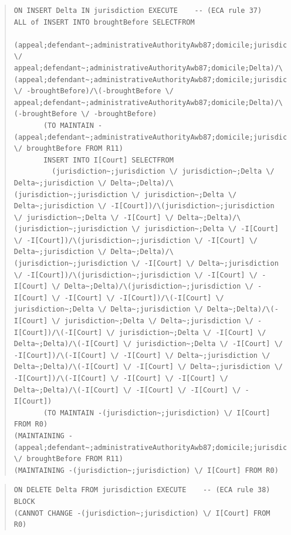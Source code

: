 \documentclass[10pt,a4paper]{report}              %
\theoremstyle{plain}\theorembodyfont{\rmfamily}\newtheorem{definition}{Definition}[section]
\theoremstyle{plain}\theorembodyfont{\rmfamily}\newtheorem{designrule}[definition]{Requirement}
\begin{document}
\begin{quote}
\begin{verbatim}
ON INSERT Delta IN jurisdiction EXECUTE    -- (ECA rule 37)
ALL of INSERT INTO broughtBefore SELECTFROM
         (appeal;defendant~;administrativeAuthorityAwb87;domicile;jurisdiction \/ appeal;defendant~;administrativeAuthorityAwb87;domicile;Delta)/\(appeal;defendant~;administrativeAuthorityAwb87;domicile;jurisdiction \/ -broughtBefore)/\(-broughtBefore \/ appeal;defendant~;administrativeAuthorityAwb87;domicile;Delta)/\(-broughtBefore \/ -broughtBefore)
       (TO MAINTAIN -(appeal;defendant~;administrativeAuthorityAwb87;domicile;jurisdiction) \/ broughtBefore FROM R11)
       INSERT INTO I[Court] SELECTFROM
         (jurisdiction~;jurisdiction \/ jurisdiction~;Delta \/ Delta~;jurisdiction \/ Delta~;Delta)/\(jurisdiction~;jurisdiction \/ jurisdiction~;Delta \/ Delta~;jurisdiction \/ -I[Court])/\(jurisdiction~;jurisdiction \/ jurisdiction~;Delta \/ -I[Court] \/ Delta~;Delta)/\(jurisdiction~;jurisdiction \/ jurisdiction~;Delta \/ -I[Court] \/ -I[Court])/\(jurisdiction~;jurisdiction \/ -I[Court] \/ Delta~;jurisdiction \/ Delta~;Delta)/\(jurisdiction~;jurisdiction \/ -I[Court] \/ Delta~;jurisdiction \/ -I[Court])/\(jurisdiction~;jurisdiction \/ -I[Court] \/ -I[Court] \/ Delta~;Delta)/\(jurisdiction~;jurisdiction \/ -I[Court] \/ -I[Court] \/ -I[Court])/\(-I[Court] \/ jurisdiction~;Delta \/ Delta~;jurisdiction \/ Delta~;Delta)/\(-I[Court] \/ jurisdiction~;Delta \/ Delta~;jurisdiction \/ -I[Court])/\(-I[Court] \/ jurisdiction~;Delta \/ -I[Court] \/ Delta~;Delta)/\(-I[Court] \/ jurisdiction~;Delta \/ -I[Court] \/ -I[Court])/\(-I[Court] \/ -I[Court] \/ Delta~;jurisdiction \/ Delta~;Delta)/\(-I[Court] \/ -I[Court] \/ Delta~;jurisdiction \/ -I[Court])/\(-I[Court] \/ -I[Court] \/ -I[Court] \/ Delta~;Delta)/\(-I[Court] \/ -I[Court] \/ -I[Court] \/ -I[Court])
       (TO MAINTAIN -(jurisdiction~;jurisdiction) \/ I[Court] FROM R0)
(MAINTAINING -(appeal;defendant~;administrativeAuthorityAwb87;domicile;jurisdiction) \/ broughtBefore FROM R11)
(MAINTAINING -(jurisdiction~;jurisdiction) \/ I[Court] FROM R0)
\end{verbatim}
\end{quote}
\begin{quote}
\begin{verbatim}
ON DELETE Delta FROM jurisdiction EXECUTE    -- (ECA rule 38)
BLOCK
(CANNOT CHANGE -(jurisdiction~;jurisdiction) \/ I[Court] FROM R0)
\end{verbatim}
\end{quote}
\end{document}
